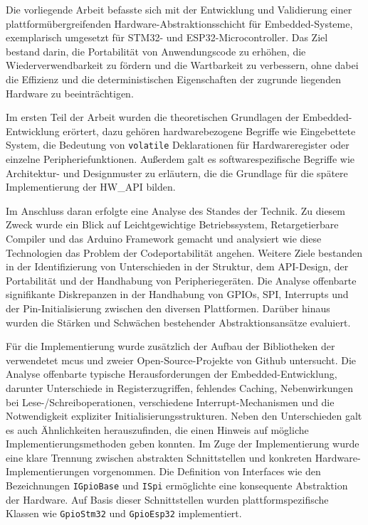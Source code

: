 
Die vorliegende Arbeit befasste sich mit der Entwicklung und Validierung einer plattformübergreifenden Hardware-Abstraktionsschicht für Embedded-Systeme, exemplarisch umgesetzt für STM32- und ESP32-Microcontroller. 
Das Ziel bestand darin, die Portabilität von Anwendungscode zu erhöhen, die Wiederverwendbarkeit zu fördern und die Wartbarkeit zu verbessern, ohne dabei die Effizienz und die deterministischen Eigenschaften der zugrunde liegenden Hardware zu beeinträchtigen.

Im ersten Teil der Arbeit wurden die theoretischen Grundlagen der Embedded-Entwicklung erörtert, dazu gehören hardwarebezogene Begriffe wie Eingebettete System, die Bedeutung von \texttt{volatile} Deklarationen für Hardwareregister oder einzelne Peripheriefunktionen.
Außerdem galt es softwarespezifische Begriffe wie Architektur- und Designmuster zu erläutern, die die Grundlage für die spätere Implementierung der HW\_API bilden.

Im Anschluss daran erfolgte eine Analyse des Standes der Technik. 
Zu diesem Zweck wurde ein Blick auf Leichtgewichtige Betriebssystem, Retargetierbare Compiler und das Arduino Framework gemacht und analysiert wie diese Technologien das Problem der Codeportabilität angehen.
Weitere Ziele bestanden in der Identifizierung von Unterschieden in der Struktur, dem API-Design, der Portabilität und der Handhabung von Peripheriegeräten. 
Die Analyse offenbarte signifikante Diskrepanzen in der Handhabung von GPIOs, SPI, Interrupts und der Pin-Initialisierung zwischen den diversen Plattformen. 
Darüber hinaus wurden die Stärken und Schwächen bestehender Abstraktionsansätze evaluiert.

Für die Implementierung wurde zusätzlich der Aufbau der Bibliotheken der verwendetet \gls{mcu}s und zweier Open-Source-Projekte von Github untersucht.
Die Analyse offenbarte typische Herausforderungen der Embedded-Entwicklung, darunter Unterschiede in Registerzugriffen, fehlendes Caching, Nebenwirkungen bei Lese-/Schreiboperationen, verschiedene Interrupt-Mechanismen und die Notwendigkeit expliziter Initialisierungsstrukturen.
Neben den Unterschieden galt es auch Ähnlichkeiten herauszufinden, die einen Hinweis auf mögliche Implementierungsmethoden geben konnten.
Im Zuge der Implementierung wurde eine klare Trennung zwischen abstrakten Schnittstellen und konkreten Hardware-Implementierungen vorgenommen. 
Die Definition von Interfaces wie den Bezeichnungen \texttt{IGpioBase} und \texttt{ISpi} ermöglichte eine konsequente Abstraktion der Hardware. 
Auf Basis dieser Schnittstellen wurden plattformspezifische Klassen wie \texttt{GpioStm32} und \texttt{GpioEsp32} implementiert.

